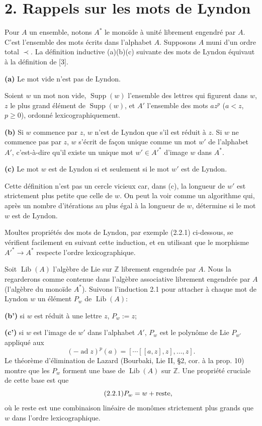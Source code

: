 \documentclass[10pt,a4paper]{article}
\newcommand{\Z}{\mathbb Z}
\newcommand{\ad}{\operatorname{ad}}
\newcommand{\supp}{\operatorname{Supp}}
\theoremstyle{deligne}
\newcommand{\heading}[1]{\vspace{0.65em}\noindent{\bfseries #1}\quad}
\begin{document}
\section*{2. Rappels sur les mots de Lyndon}

\heading{2.1.} Pour \(A\) un ensemble, notons \(A^*\) le monoïde à unité librement engendré par \(A\). C'est l'ensemble des mots écrits dans l'alphabet \(A\). Supposons \(A\) muni d'un ordre total \(\prec\). La définition inductive (a)(b)(c) suivante des mots de Lyndon équivaut à la définition de [3].

\textbf{(a)} Le mot vide n'est pas de Lyndon.

Soient \(w\) un mot non vide, \(\supp(w)\) l'ensemble des lettres qui figurent dans \(w\), \(z\) le plus grand élément de \(\supp(w)\), et \(A'\) l'ensemble des mots \(az^p\) (\(a<z\), \(p\ge0\)), ordonné lexicographiquement.

\textbf{(b)} Si \(w\) commence par \(z\), \(w\) n'est de Lyndon que s'il est réduit à \(z\). Si \(w\) ne commence pas par \(z\), \(w\) s'écrit de façon unique comme un mot \(w'\) de l'alphabet \(A'\), c'est-à-dire qu'il existe un unique mot \(w'\in A'^*\) d'image \(w\) dans \(A^*\).

\textbf{(c)} Le mot \(w\) est de Lyndon si et seulement si le mot \(w'\) est de Lyndon.

Cette définition n'est pas un cercle vicieux car, dans (c), la longueur de \(w'\) est strictement plus petite que celle de \(w\). On peut la voir comme un algorithme qui, après un nombre d'itérations au plus égal à la longueur de \(w\), détermine si le mot \(w\) est de Lyndon.

Moultes propriétés des mots de Lyndon, par exemple (2.2.1) ci-dessous, se vérifient facilement en suivant cette induction, et en utilisant que le morphisme \(A'^*\to A^*\) respecte l'ordre lexicographique.

\heading{2.2.} Soit \(\operatorname{Lib}(A)\) l'algèbre de Lie sur \(\Z\) librement engendrée par \(A\). Nous la regarderons comme contenue dans l'algèbre associative librement engendrée par \(A\) (l'algèbre du monoïde \(A^*\)). Suivons l'induction 2.1 pour attacher à chaque mot de Lyndon \(w\) un élément \(P_w\) de \(\operatorname{Lib}(A)\):

\textbf{(b')} si \(w\) est réduit à une lettre \(z\), \(P_w:=z\);

\textbf{(c')} si \(w\) est l'image de \(w'\) dans l'alphabet \(A'\), \(P_w\) est le polynôme de Lie \(P_{w'}\) appliqué aux
\[
(-\ad z)^p(a)=[\cdots[[a,z],z],\ldots,z].
\]
Le théorème d'élimination de Lazard (Bourbaki, Lie II, \S2, cor. à la prop. 10) montre que les \(P_w\) forment une base de \(\operatorname{Lib}(A)\) sur \(\Z\). Une propriété cruciale de cette base est que
\[
\tag{2.2.1}
P_w=w+\hbox{reste},
\]
où le reste est une combinaison linéaire de monômes strictement plus grands que \(w\) dans l'ordre lexicographique.
\end{document}
